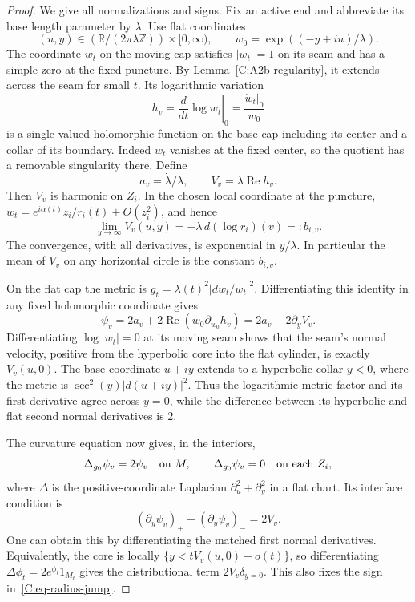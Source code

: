 \begin{proof}
We give all normalizations and signs. Fix an active end and abbreviate its base length parameter by $\lambda$. Use flat coordinates
\[
 (u,y)\in(\mathbb R/(2\pi\lambda\mathbb Z))\times[0,\infty),
 \qquad w_0=\exp((-y+iu)/\lambda).
\]
The coordinate $w_t$ on the moving cap satisfies $|w_t|=1$ on its seam and has a simple zero at the fixed puncture. By Lemma~\ref{C:A2b-regularity}, it extends across the seam for small $t$. Its logarithmic variation
\[
 h_v=\left.\frac{d}{dt}\log w_t\right|_0
       =\frac{\dot w_t|_0}{w_0}
\]
is a single-valued holomorphic function on the base cap including its center and a collar of its boundary. Indeed $w_t$ vanishes at the fixed center, so the quotient has a removable singularity there. Define
\[
 a_v=\dot\lambda/\lambda,\qquad V_v=\lambda\operatorname{Re}h_v.
\]
Then $V_v$ is harmonic on $Z_i$. In the chosen local coordinate at the puncture,
$w_t=e^{i\alpha(t)}z_i/r_i(t)+O(z_i^2)$, and hence
\begin{equation}
 \lim_{y\to\infty}V_v(u,y)
   =-\lambda\,d(\log r_i)(v)=:b_{i,v}.
 \label{C:eq-radius-end}
\end{equation}
The convergence, with all derivatives, is exponential in $y/\lambda$. In particular the mean of $V_v$ on any horizontal circle is the constant $b_{i,v}$.

On the flat cap the metric is $g_t=\lambda(t)^2|dw_t/w_t|^2$. Differentiating this identity in any fixed holomorphic coordinate gives
\[
 \psi_v=2a_v+2\operatorname{Re}(w_0\partial_{w_0}h_v)
        =2a_v-2\partial_y V_v.
\]
Differentiating $\log|w_t|=0$ at its moving seam shows that the seam's normal velocity, positive from the hyperbolic core into the flat cylinder, is exactly $V_v(u,0)$. The base coordinate $u+iy$ extends to a hyperbolic collar $y<0$, where the metric is $\sec^2(y)|d(u+iy)|^2$. Thus the logarithmic metric factor and its first derivative agree across $y=0$, while the difference between its hyperbolic and flat second normal derivatives is $2$.

The curvature equation now gives, in the interiors,
\[
 \Delta_{g_0}\psi_v=2\psi_v\quad\hbox{on }M,
 \qquad \Delta_{g_0}\psi_v=0\quad\hbox{on each }Z_i,
\]
where $\Delta$ is the positive-coordinate Laplacian $\partial_u^2+\partial_y^2$ in a flat chart. Its interface condition is
\begin{equation}
 (\partial_y\psi_v)_{+}-(\partial_y\psi_v)_{-}=2V_v.
 \label{C:eq-radius-jump}
\end{equation}
One can obtain this by differentiating the matched first normal derivatives. Equivalently, the core is locally $\{y<tV_v(u,0)+o(t)\}$, so differentiating
$\Delta\phi_t=2e^{\phi_t}1_{M_t}$ gives the distributional term $2V_v\delta_{y=0}$. This also fixes the sign in~\eqref{C:eq-radius-jump}.


\end{proof}

